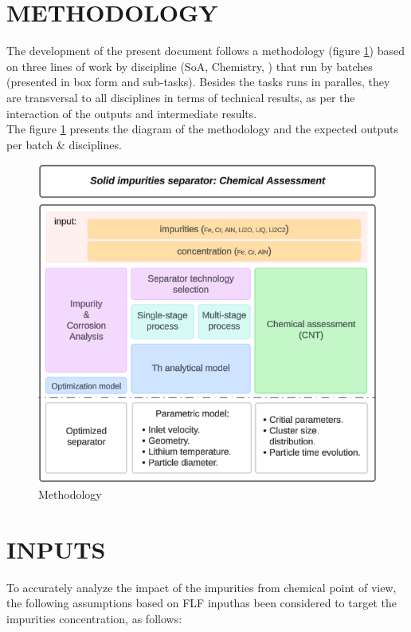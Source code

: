 \newpage
\section{METHODOLOGY} %

The development of the present document follows a methodology (figure \ref{methodology}) based on three lines of work by discipline (SoA, Chemistry, ) that run by batches (presented in box form and sub-tasks). Besides the tasks runs in paralles, they are transversal to all disciplines in terms of technical results, as per the interaction of the outputs and intermediate results. \\

\noindent The figure \ref{methodology} presents the diagram of the methodology and the expected outputs per batch \& disciplines.


\begin{figure}[H]
	\centering
	\includegraphics[width=0.8\linewidth]{methodology.png}
	\captionsetup{font=bf, size=small}
	\caption{Methodology}
	\label{methodology}
\end{figure}



\newpage
\section{INPUTS} %
 To accurately analyze the impact of the impurities from chemical point of view, the following assumptions based on FLF inputhas been considered to target the impurities concentration, as follows:


